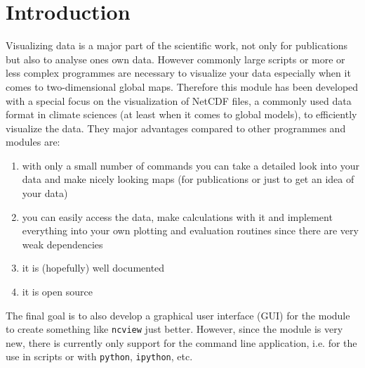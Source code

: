 \chapter{Introduction}
Visualizing data is a major part of the scientific work, not only for publications but also to analyse ones own data. However commonly large scripts or more or less complex programmes are necessary to visualize your data especially when it comes to two-dimensional global maps. Therefore this module has been developed with a special focus on the visualization of NetCDF files, a commonly used data format in climate sciences (at least when it comes to global models), to efficiently visualize the data. They major advantages compared to other programmes and modules are:
\begin{enumerate}
	\item with only a small number of commands you can take a detailed look into your data and make nicely looking maps (for publications or just to get an idea of your data)
	\item you can easily access the data, make calculations with it and implement everything into your own plotting and evaluation routines since there are very weak dependencies
	\item it is (hopefully) well documented
	\item it is open source
\end{enumerate}
The final goal is to also develop a graphical user interface (GUI) for the module to create something like \lstinline|ncview| just better. However, since the module is very new, there is currently only support for the command line application, i.e. for the use in scripts or with \lstinline|python|, \lstinline|ipython|, etc.

